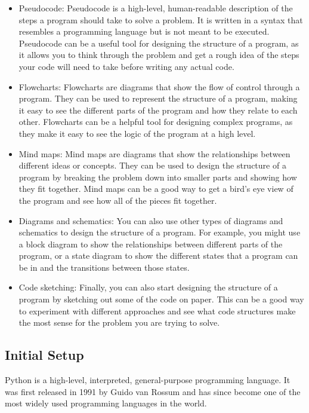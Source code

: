 \begin{itemize}
    \item Pseudocode: Pseudocode is a high-level, human-readable description of the steps a program should take to solve a problem. It is written in a syntax that resembles a programming language but is not meant to be executed. Pseudocode can be a useful tool for designing the structure of a program, as it allows you to think through the problem and get a rough idea of the steps your code will need to take before writing any actual code.
    \item Flowcharts: Flowcharts are diagrams that show the flow of control through a program. They can be used to represent the structure of a program, making it easy to see the different parts of the program and how they relate to each other. Flowcharts can be a helpful tool for designing complex programs, as they make it easy to see the logic of the program at a high level.
    \item Mind maps: Mind maps are diagrams that show the relationships between different ideas or concepts. They can be used to design the structure of a program by breaking the problem down into smaller parts and showing how they fit together. Mind maps can be a good way to get a bird's eye view of the program and see how all of the pieces fit together.
    \item Diagrams and schematics: You can also use other types of diagrams and schematics to design the structure of a program. For example, you might use a block diagram to show the relationships between different parts of the program, or a state diagram to show the different states that a program can be in and the transitions between those states.
    \item Code sketching: Finally, you can also start designing the structure of a program by sketching out some of the code on paper. This can be a good way to experiment with different approaches and see what code structures make the most sense for the problem you are trying to solve.
\end{itemize}

\newpage
\subsection{Initial Setup}

Python is a high-level, interpreted, general-purpose programming language. It was first released in 1991 by Guido van Rossum and has since become one of the most widely used programming languages in the world.

